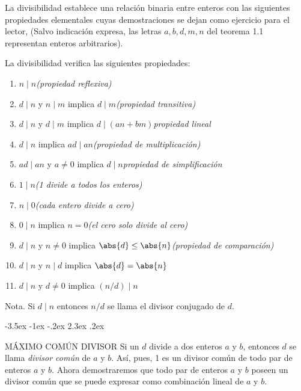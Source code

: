 \documentclass[12pt,a4paper]{book}
\makeatletter
\renewcommand\section{\@startsection{section}{1}{\z@}%
  {-3.5ex \@plus -1ex \@minus -.2ex}%
  {2.3ex \@plus .2ex}%
  {\normalfont\Large\bfseries\raggedright}}
\makeatother
\begin{document}
    La divisibilidad establece una relación binaria entre enteros con las siguientes propiedades
    elementales cuyas demostraciones se dejan como ejercicio para el lector, (Salvo indicación
    expresa, las letras $a,b,d,m,n$ del teorema 1.1 representan enteros arbitrarios).

    \begin{teorema}
        La divisibilidad verifica las siguientes propiedades:
        \begin{enumerate}
            \item[(a)] $n\mid n$\hfill \textit{(propiedad reflexiva)}
            \item[(b)] $d\mid n$ y $n\mid m$ implica $d\mid m$\hfill\textit{(propiedad transitiva)}
            \item[(c)] $d\mid n$ y $d\mid m$ implica $d\mid(an+bm)$\hfill\textit{propiedad lineal}
            \item[(d)] $d\mid n$ implica $ad\mid an$\hfill\textit{(propiedad de multiplicación)}
            \item[(e)] $ad\mid an$ y $a\neq0$ implica $d\mid n$\hfill\textit{propiedad de simplificación}
            \item[(f)] $1\mid n$\hfill\textit{(1 divide a todos los enteros)}
            \item[(g)] $n\mid0$\hfill\textit{(cada entero divide a cero)}
            \item[(h)] $0\mid n$ implica $n=0$\hfill\textit{(el cero solo divide al cero)}
            \item[(i)] $d\mid n$ y $n\neq0$ implica $\abs{d}\leq\abs{n}$\hfill\textit{(propiedad de comparación)}
            \item[(j)] $d\mid n$ y $n\mid d$ implica $\abs{d}=\abs{n}$
            \item[(k)] $d\mid n$ y $d\neq0$ implica $(n/d)\mid n$
        \end{enumerate}
    \end{teorema}

    Nota. Si $d\mid n$ entonces $n/d$ se llama el divisor conjugado de $d$.

    \section{MÁXIMO COMÚN DIVISOR}\label{sim:gcd}
    Si un $d$ divide a dos enteros $a$ y $b$, entonces $d$ se llama \textit{divisor común}
    de $a$ y $b$. Así, pues, 1 es un divisor común de todo par de enteros $a$ y $b$. Ahora
    demostraremos que todo par de enteros $a$ y $b$ poseen un divisor común que se puede expresar
    como combinación lineal de $a$ y $b$.
\end{document}
